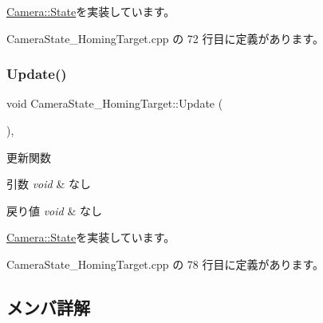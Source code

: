 \mbox{\hyperlink{class_camera_1_1_state_adb3f43b6c3f8100da7877867180e804b}{Camera\+::\+State}}を実装しています。



 Camera\+State\+\_\+\+Homing\+Target.\+cpp の 72 行目に定義があります。

\mbox{\label{class_camera_state___homing_target_a488be0a41b5c00fbfaa56db73aefd45c}} 
\subsubsection{\texorpdfstring{Update()}{Update()}}
{\footnotesize\ttfamily void Camera\+State\+\_\+\+Homing\+Target\+::\+Update (\begin{DoxyParamCaption}{ }\end{DoxyParamCaption})\hspace{0.3cm}{\ttfamily [override]}, {\ttfamily [virtual]}}



更新関数 


\begin{DoxyParams}{引数}
{\em void} & なし \\
\hline
\end{DoxyParams}

\begin{DoxyRetVals}{戻り値}
{\em void} & なし \\
\hline
\end{DoxyRetVals}


\mbox{\hyperlink{class_camera_1_1_state_ab94ec2ba6c56d974cf9e0d7d232948cf}{Camera\+::\+State}}を実装しています。



 Camera\+State\+\_\+\+Homing\+Target.\+cpp の 78 行目に定義があります。



\subsection{メンバ詳解}
\mbox{\label{class_camera_state___homing_target_ab96ca0ef3a0b7f125fcee847556ff4a9}} 
